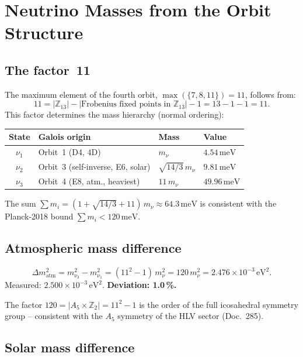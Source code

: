 \section{Neutrino Masses from the Orbit Structure \KM}

\subsection{The factor~11}

The maximum element of the fourth orbit, $\max(\{7,8,11\})=11$,
follows from:
\[
11=|\mathbb{Z}_{13}|-|\text{Frobenius fixed points in }\mathbb{Z}_{13}|-1
  =13-1-1=11.
\]
This factor determines the mass hierarchy (normal ordering):

\begin{center}
\begin{tabular}{clll}
\toprule
State & Galois origin & Mass & Value \\
\midrule
$\nu_1$ & Orbit~1 (D4, 4D) & $m_\nu$ & $4.54\,\text{meV}$ \\
$\nu_2$ & Orbit~3 (self-inverse, E6, solar) & $\sqrt{14/3}\,m_\nu$ & $9.81\,\text{meV}$ \\
$\nu_3$ & Orbit~4 (E8, atm., heaviest) & $11\,m_\nu$ & $49.96\,\text{meV}$ \\
\bottomrule
\end{tabular}
\end{center}

The sum $\sum m_i=(1+\sqrt{14/3}+11)\,m_\nu\approx64.3\,\text{meV}$
is consistent with the Planck-2018 bound $\sum m_i<120\,\text{meV}$.

\subsection{Atmospheric mass difference}

\[
\Delta m^2_\text{atm}=m_{\nu_3}^2-m_{\nu_1}^2
=(11^2-1)\,m_\nu^2=120\,m_\nu^2
=2.476\times10^{-3}\,\text{eV}^2.
\]
Measured: $2.500\times10^{-3}\,\text{eV}^2$. \textbf{Deviation: 1.0\,\%.}

The factor $120=|A_5\times\mathbb{Z}_2|=11^2-1$ is the order of the full
icosahedral symmetry group -- consistent with the $A_5$ symmetry of the
HLV sector (Doc.~285).

\subsection{Solar mass difference}

